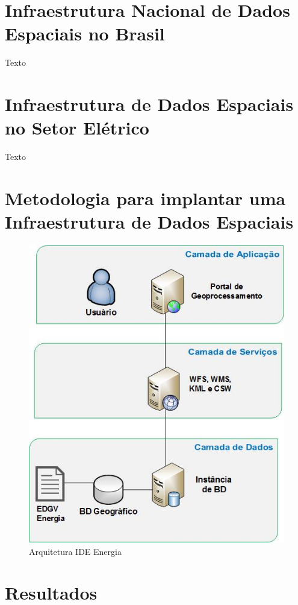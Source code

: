 \documentclass[preprint,authoryear,12pt]{elsarticle}
\begin{document}
\section{Infraestrutura Nacional de Dados Espaciais no Brasil}
\label{sec2}
Texto

\section{Infraestrutura de Dados Espaciais no Setor El\'etrico}
\label{sec3}
Texto

\section{Metodologia para implantar uma Infraestrutura de Dados Espaciais}
\label{sec4}

\begin{figure}[H]
    \centering
    \includegraphics[scale=0.7]{fig3}
    \caption{Arquitetura IDE Energia}
    \label{fig:my_label}
\end{figure}

\section{Resultados}
\label{sec5}
\end{document}
